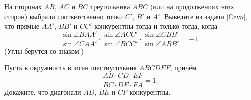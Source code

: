 \documentclass[a4paper,12pt]{article}
\begin{document}
 На сторонах $AB$, $AC$ и $BC$
треугольника $ABC$ (или на продолжениях этих сторон) выбрали
соответственно точки $C'$, $B'$ и $A'$. Выведите из задачи
\ref{Ceva}, что прямые $AA'$, $BB'$ и $CC'$ конкурентны тогда и
только тогда, когда
  $$
  \frac{\sin\angle BAA'}{\sin\angle CAA'}\cdot \frac{\sin\angle
  ACC'}{\sin\angle BCC'}\cdot \frac{\sin\angle CBB'}{\sin\angle
  ABB'} = -1.
  $$
(Углы берутся со знаком!) 

 Пусть в окружность вписан шестиугольник $ABCDEF$, причём
  $$
  \frac{AB\cdot CD\cdot EF}{BC\cdot DE\cdot FA} = 1.
  $$
Докажите, что диагонали $AD$, $BE$ и $CF$ конкурентны. 



\end{document}
